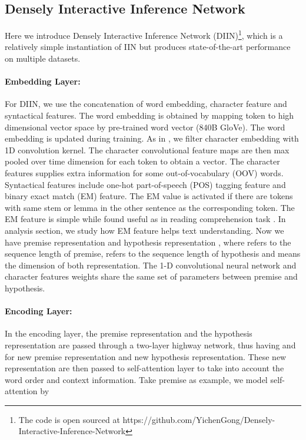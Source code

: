 \documentclass{article} \usepackage{iclr2018_conference,times}
\begin{document}
\subsection{Densely Interactive Inference Network}
Here we introduce Densely Interactive Inference Network (DIIN)\footnote{The code is open sourced at https://github.com/YichenGong/Densely-Interactive-Inference-Network}, which is a relatively simple instantiation of IIN but produces state-of-the-art performance on multiple datasets.

\paragraph{Embedding Layer: } For DIIN, we use the concatenation of word embedding, character feature and syntactical features. The word embedding is obtained by mapping token to high dimensional vector space by pre-trained word vector (840B GloVe). The word embedding is updated during training. As in \citep{char_mxp_Kim:2016vh,char_mxp_Lee:2016wl}, we filter character embedding with 1D convolution kernel. The character convolutional feature maps are then max pooled over time dimension for each token to obtain a vector. The character features supplies extra information for some out-of-vocabulary (OOV) words. Syntactical features include one-hot part-of-speech (POS) tagging feature and binary exact match (EM) feature. The EM value is activated if there are tokens with same stem or lemma in the other sentence as the corresponding token. The EM feature is simple while found useful as in reading comprehension task \citep{document_reader_2017arXiv170400051C}. In analysis section, we study how EM feature helps text understanding. Now we have premise representation  and hypothesis representation  , where  refers to the sequence length of premise,  refers to the sequence length of hypothesis and  means the dimension of both representation. The 1-D convolutional neural network and character features weights share the same set of parameters between premise and hypothesis. 

\paragraph{Encoding Layer: } In the encoding layer, the premise representation  and the hypothesis representation  are passed through a two-layer highway network, thus having  and  for new premise representation and new hypothesis representation. These new representation are then passed to self-attention layer to take into account the word order and context information. Take premise as example, we model self-attention by
\end{document}
